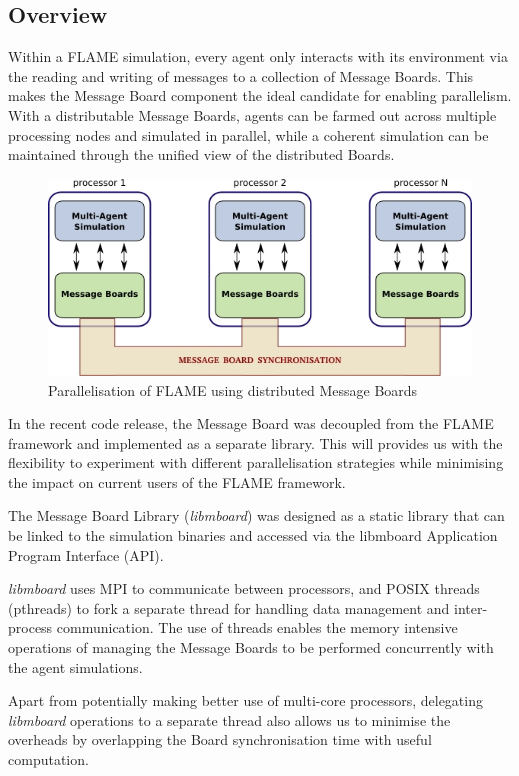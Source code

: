 \subsection{Overview}

Within a FLAME simulation, every agent only interacts with its environment via the reading and writing of messages to a collection of Message Boards. This makes the Message Board component the ideal candidate for enabling parallelism. With a distributable Message Boards, agents can be farmed out across multiple processing nodes and simulated in parallel, while a coherent simulation can be maintained through the unified view of the distributed Boards.

\begin{figure}[h]
 \centering
  \includegraphics[scale=0.50]{mboard_flame.jpg}
 \caption{Parallelisation of FLAME using distributed Message Boards}
 \label{fig:mb_flame}
\end{figure}

In the recent code release, the Message Board was decoupled from the FLAME framework and implemented as a separate library. This will provides us with the flexibility to experiment with different parallelisation strategies while minimising the impact on current users of the FLAME framework.

The Message Board Library (\textit{libmboard}) was designed as a static library that can be linked to the simulation binaries and accessed via the libmboard Application Program Interface (API). 

\textit{libmboard} uses MPI to communicate between processors, and POSIX threads (pthreads) to fork a separate thread for handling data management and inter-process communication. The use of threads enables the memory intensive operations of managing the Message Boards to be performed concurrently with the agent simulations. 

Apart from potentially making better use of multi-core processors, delegating \textit{libmboard} operations to a separate thread also allows us to minimise the overheads by overlapping the Board synchronisation time with useful computation.